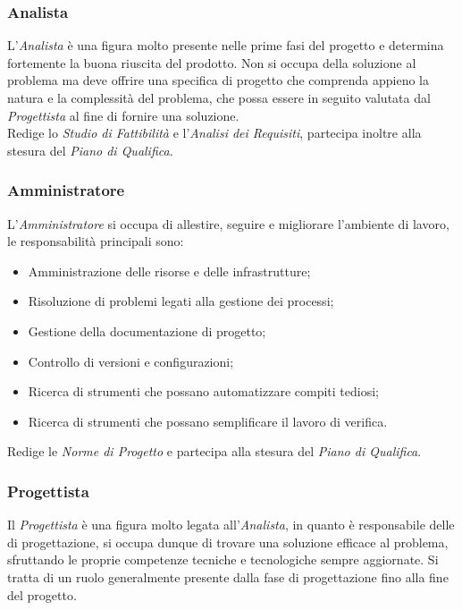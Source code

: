 \documentclass{scalatekids-article}
\begin{document}
\subsubsection{Analista}
L'\textit{Analista} è una figura molto presente nelle prime fasi del progetto e
determina fortemente la buona riuscita del prodotto. Non si occupa della
soluzione al problema ma deve offrire una specifica di progetto che comprenda
appieno la natura e la complessità del problema, che possa essere in seguito
valutata dal \textit{Progettista} al fine di fornire una soluzione.\\ Redige lo
\textit{Studio di Fattibilità} e l'\textit{Analisi dei Requisiti}, partecipa
inoltre alla stesura del \textit{Piano di Qualifica}.
\subsubsection{Amministratore}
L'\textit{Amministratore} si occupa di allestire, seguire e migliorare
l'ambiente di lavoro, le responsabilità principali sono:
\begin{itemize}
\item Amministrazione delle risorse e delle infrastrutture;
\item Risoluzione di problemi legati alla gestione dei processi;
\item Gestione della documentazione di progetto;
\item Controllo di versioni e configurazioni;
\item Ricerca di strumenti che possano automatizzare compiti tediosi;
\item Ricerca di strumenti che possano semplificare il lavoro di verifica.
\end{itemize}
Redige le \textit{Norme di Progetto} e partecipa alla stesura del \textit{Piano
  di Qualifica}.
\subsubsection{Progettista}
Il \textit{Progettista} è una figura molto legata all'\textit{Analista}, in
quanto è responsabile delle  di progettazione, si occupa dunque di
trovare una soluzione efficace al problema, sfruttando le proprie competenze
tecniche e tecnologiche sempre aggiornate. Si tratta di un ruolo generalmente
presente dalla fase di progettazione fino alla fine del progetto.
\end{document}
